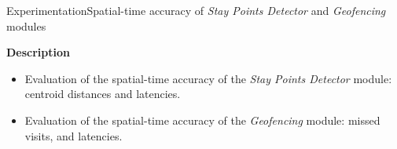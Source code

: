 \begin{frame}{Experimentation}{Spatial-time accuracy of \emph{Stay Points Detector} and \emph{Geofencing} modules}
\small

\begin{block}{\small \textbf{Description}}
\begin{itemize}
  \item Evaluation of the spatial-time accuracy of the \emph{Stay Points Detector} module: centroid distances and latencies.
  \item Evaluation of the spatial-time accuracy of the \emph{Geofencing} module: missed visits, and latencies.
\end{itemize}

\begin{columns}
\begin{column}[T]{0.5\textwidth}
\begin{table}
\centering
\renewcommand{\arraystretch}{0.6}
\caption{Input parameters for the spatial-time accuracy of stay points experiment.}
\end{table}
\end{column}

\begin{column}[T]{0.5\textwidth}
\begin{table}
\centering
\renewcommand{\arraystretch}{0.6}
\end{table}
\end{column}
\end{columns}
\end{block}
\end{frame}
